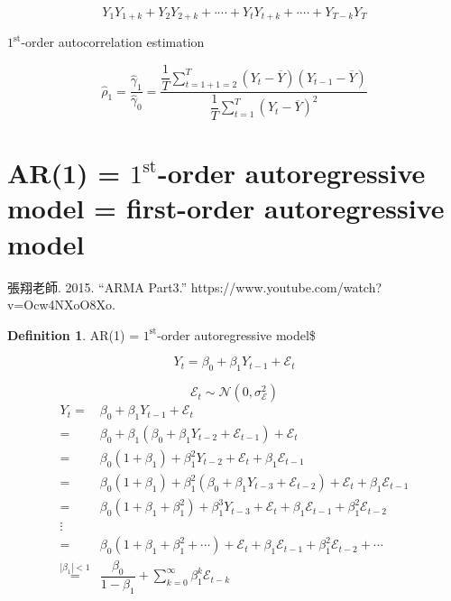 \documentclass[
]{book}
\theoremstyle{definition}
\newtheorem{definition}{Definition}[chapter]
\theoremstyle{definition}
\theoremstyle{definition}
\theoremstyle{definition}
\theoremstyle{remark}
\begin{document}
\[
Y_{1}Y_{1+k}+Y_{2}Y_{2+k}+\cdot\cdots+Y_{t}Y_{t+k}+\cdot\cdots+Y_{T-k}Y_{T}
\]

\(1^\text{st}\)-order autocorrelation estimation

\[
\widehat{\rho}_{1}=\dfrac{\widehat{\gamma}_{1}}{\widehat{\gamma}_{0}}=\dfrac{\dfrac{1}{T}\sum\limits _{t=1+1=2}^{T}\left(Y_{t}-\overline{Y}\right)\left(Y_{t-1}-\overline{Y}\right)}{\dfrac{1}{T}\sum\limits _{t=1}^{T}\left(Y_{t}-\overline{Y}\right)^{2}}
\]

\section{\texorpdfstring{AR(1) = \(1^\text{st}\)-order autoregressive model = first-order autoregressive model}{AR(1) = 1\^{}\textbackslash text\{st\}-order autoregressive model = first-order autoregressive model}}\label{ar1-1textst-order-autoregressive-model-first-order-autoregressive-model}

\begin{CJK}{UTF8}{bsmi}
張翔老師. 2015. “ARMA Part3.” https://www.youtube.com/watch?v=Ocw4NXoO8Xo.
\end{CJK}

\begin{definition}
\protect\hypertarget{def:unnamed-chunk-5}{}\label{def:unnamed-chunk-5}AR(1) = \(1^\text{st}\)-order autoregressive model\$
\end{definition}

\[
Y_{t}=\beta_{0}+\beta_{1}Y_{t-1}+\mathcal{E}_{t}
\]

\[
\mathcal{E}_{t}\sim\mathcal{N}\left(0,\sigma_{\mathcal{E}}^{2}\right)
\]
\[
\begin{aligned}
Y_{t}= & \beta_{0}+\beta_{1}Y_{t-1}+\mathcal{E}_{t}\\
= & \beta_{0}+\beta_{1}\left(\beta_{0}+\beta_{1}Y_{t-2}+\mathcal{E}_{t-1}\right)+\mathcal{E}_{t}\\
= & \beta_{0}\left(1+\beta_{1}\right)+\beta_{1}^{2}Y_{t-2}+\mathcal{E}_{t}+\beta_{1}\mathcal{E}_{t-1}\\
= & \beta_{0}\left(1+\beta_{1}\right)+\beta_{1}^{2}\left(\beta_{0}+\beta_{1}Y_{t-3}+\mathcal{E}_{t-2}\right)+\mathcal{E}_{t}+\beta_{1}\mathcal{E}_{t-1}\\
= & \beta_{0}\left(1+\beta_{1}+\beta_{1}^{2}\right)+\beta_{1}^{3}Y_{t-3}+\mathcal{E}_{t}+\beta_{1}\mathcal{E}_{t-1}+\beta_{1}^{2}\mathcal{E}_{t-2}\\
\vdots\\
= & \beta_{0}\left(1+\beta_{1}+\beta_{1}^{2}+\cdots\right)+\mathcal{E}_{t}+\beta_{1}\mathcal{E}_{t-1}+\beta_{1}^{2}\mathcal{E}_{t-2}+\cdots\\
\overset{\left|\beta_{1}\right|<1}{=} & \dfrac{\beta_{0}}{1-\beta_{1}}+\sum_{k=0}^{\infty}\beta_{1}^{k}\mathcal{E}_{t-k}
\end{aligned}
\]
\end{document}
